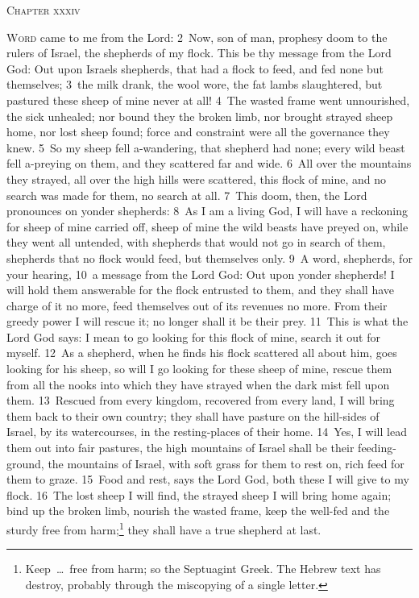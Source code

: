 \documentclass[10pt]{book} %
\begin{document}
\begin{large}\begin{center}\textsc{Chapter xxxiv}\end{center}\end{large}
\lettrine[lines=2]{W}{ord} came to me from the Lord: \textcolor{benred8}{2}~Now, son of man, prophesy doom to the rulers of Israel, the shepherds of my flock. This be thy message from the Lord God: Out upon Israel\textquotesingle s shepherds, that had a flock to feed, and fed none but themselves; \textcolor{benred8}{3}~the milk drank, the wool wore, the fat lambs slaughtered, but pastured these sheep of mine never at all! \textcolor{benred8}{4}~The wasted frame went unnourished, the sick unhealed; nor bound they the broken limb, nor brought strayed sheep home, nor lost sheep found; force and constraint were all the governance they knew. \textcolor{benred8}{5}~So my sheep fell a-wandering, that shepherd had none; every wild beast fell a-preying on them, and they scattered far and wide. \textcolor{benred8}{6}~All over the mountains they strayed, all over the high hills were scattered, this flock of mine, and no search was made for them, no search at all. \textcolor{benred8}{7}~This doom, then, the Lord pronounces on yonder shepherds: \textcolor{benred8}{8}~As I am a living God, I will have a reckoning for sheep of mine carried off, sheep of mine the wild beasts have preyed on, while they went all untended, with shepherds that would not go in search of them, shepherds that no flock would feed, but themselves only. \textcolor{benred8}{9}~A word, shepherds, for your hearing, \textcolor{benred8}{10}~a message from the Lord God: Out upon yonder shepherds! I will hold them answerable for the flock entrusted to them, and they shall have charge of it no more, feed themselves out of its revenues no more. From their greedy power I will rescue it; no longer shall it be their prey.
\textcolor{benred8}{11}~This is what the Lord God says: I mean to go looking for this flock of mine, search it out for myself. \textcolor{benred8}{12}~As a shepherd, when he finds his flock scattered all about him, goes looking for his sheep, so will I go looking for these sheep of mine, rescue them from all the nooks into which they have strayed when the dark mist fell upon them. \textcolor{benred8}{13}~Rescued from every kingdom, recovered from every land, I will bring them back to their own country; they shall have pasture on the hill-sides of Israel, by its watercourses, in the resting-places of their home. \textcolor{benred8}{14}~Yes, I will lead them out into fair pastures, the high mountains of Israel shall be their feeding-ground, the mountains of Israel, with soft grass for them to rest on, rich feed for them to graze. \textcolor{benred8}{15}~Food and rest, says the Lord God, both these I will give to my flock. \textcolor{benred8}{16}~The lost sheep I will find, the strayed sheep I will bring home again; bind up the broken limb, nourish the wasted frame, keep the well-fed and the sturdy free from harm;\footnote[1]{\textasciigrave Keep\ \ldots\  free from harm\textquotesingle ; so the Septuagint Greek. The Hebrew text has \textasciigrave destroy\textquotesingle , probably through the miscopying of a single letter.} they shall have a true shepherd at last.
\end{document}
